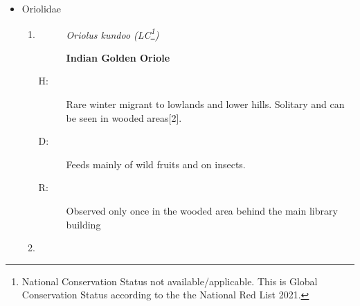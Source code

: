 \begin{itemize}
\begin{enumerate}
\begin{description}
\item[D: ]%
Primarily feeds on nectar, occasionally supplementing their diet with insects, especially when tending to their young.%
\item[R: ]%
In Kaju Kele area, trees around the Bhavana and trees of Ceremonial courtyard. %
\end{description}%
\item%
\begin{description}%
\item[]%
\textit{Cinnyris lotenius (LC)}%
\item[]%
\textbf{Long{-}billed Sunbird/Loten's Sunbird}%
\end{description}%
\begin{description}%
\item[H: ]%
Fairly common breeding resident throughout Sri Lanka. But less common in the high hills. Can be observed in forests, wooded areas and gardens{[}2{]}.%
\item[D: ]%
Consumes small insects and spiders, similar to other Sunbird species.%
\item[R: ]%
Surrounding area of Dept. of FD \& PD. In the trees around the Bhavana and trees of Ceremonial courtyard.%
\end{description}%
\end{enumerate}%
\item%
Oriolidae%
\begin{enumerate}%
\item%
\begin{description}%
\item[]%
\textit{Oriolus kundoo (LC\footnote{\label{NO-LCS}National Conservation Status not available/applicable. This is Global Conservation Status according to the the National Red List 2021.})}%
\item[]%
\textbf{Indian Golden Oriole}%
\end{description}%
\begin{description}%
\item[H: ]%
Rare winter migrant to lowlands and lower hills. Solitary and can be seen in wooded areas{[}2{]}.%
\item[D: ]%
Feeds mainly of wild fruits and on insects. %
\item[R: ]%
Observed only once in the wooded area behind the main library building%
\end{description}%
\item%
\begin{description}%
\item[]%

\end{description}
\end{enumerate}
\end{itemize}
